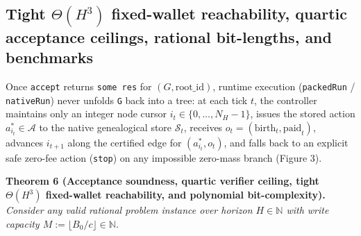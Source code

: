 \documentclass[11pt,letterpaper]{article}
\begin{document}
\subsection{\texorpdfstring{Tight \(\Theta(H^3)\) fixed-wallet
reachability, quartic acceptance ceilings, rational bit-lengths, and
benchmarks}{Tight \textbackslash Theta(H\^{}3) fixed-wallet reachability, quartic acceptance ceilings, rational bit-lengths, and benchmarks}}\label{tight-thetah3-fixed-wallet-reachability-quartic-acceptance-ceilings-rational-bit-lengths-and-benchmarks}

Once \texttt{accept} returns \texttt{some\ res} for
\((G, \mathrm{root\_id})\), runtime execution (\texttt{packedRun} /
\texttt{nativeRun}) never unfolds \texttt{G} back into a tree: at each
tick \(t\), the controller maintains only an integer node cursor
\(i_t \in \{0, \dots, N_H - 1\}\), issues the stored action
\(a_{i_t}^* \in \mathcal{A}\) to the native genealogical store
\(\mathcal{S}_t\), receives
\(o_t = (\mathrm{birth}_t, \mathrm{paid}_t)\), advances \(i_{t+1}\)
along the certified edge for \((a_{i_t}^*, o_t)\), and falls back to an
explicit safe zero-fee action (\texttt{stop}) on any impossible
zero-mass branch (Figure 3).

\textbf{Theorem 6 (Acceptance soundness, quartic verifier ceiling, tight
\(\Theta(H^3)\) fixed-wallet reachability, and polynomial
bit-complexity).} \emph{Consider any valid rational problem instance
over horizon \(H \in \mathbb{N}\) with write capacity
\(M := \lfloor B_0 / c \rfloor \in \mathbb{N}\).}
\end{document}
